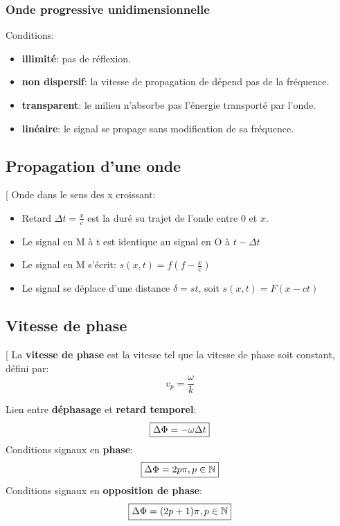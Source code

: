 \documentclass[12pt,hidelinks]{article}
\begin{document}
    \subsubsection{Onde progressive unidimensionnelle}
    Conditions:
    \begin{itemize}
        \item \textbf{illimité}: pas de réflexion.
        \item \textbf{non dispersif}: la vitesse de propagation de dépend pas de la fréquence.
        \item \textbf{transparent}: le milieu n'absorbe pas l'énergie transporté par l'onde.
        \item \textbf{linéaire}: le signal se propage sans modification de sa fréquence.
    \end{itemize}
    \subsection{Propagation d'une onde}
    \begin{DashedDefinition}{}[
    Onde dans le sens des x croissant:
    \begin{itemize}
        \item Retard $\Delta t= \frac{x}{c}$ est la duré su trajet de l'onde entre 0 et $x$.
        \item Le signal en M à t est identique au signal en O à $t-\Delta t$
        \item Le signal en M s'écrit: $s(x,t)=f(f-\frac{x}{c})$
        \item Le signal se déplace d'une distance $\delta=st$, soit $s(x,t)=F(x-ct)$
    \end{itemize}
    \end{DashedDefinition}
    \subsection{Vitesse de phase}
    \begin{DashedDefinition}{}[
    La \textbf{vitesse de phase} est la vitesse tel que la vitesse de phase soit constant, défini par:
    \[v_p= \frac{\omega}{k}\]
    \end{DashedDefinition}
    Lien entre \textbf{déphasage} et \textbf{retard temporel}:
    \[\fbox{$\Delta \Phi = - \omega \Delta t$}\]
    Conditions signaux en \textbf{phase}:
    \[\fbox{$\Delta \Phi=2p \pi, p \in \mathbb{N}$}\]
    Conditions signaux en \textbf{opposition de phase}:
    \[\fbox{$\Delta \Phi=(2p+1) \pi, p \in \mathbb{N}$}\]
\newpage
\end{document}
